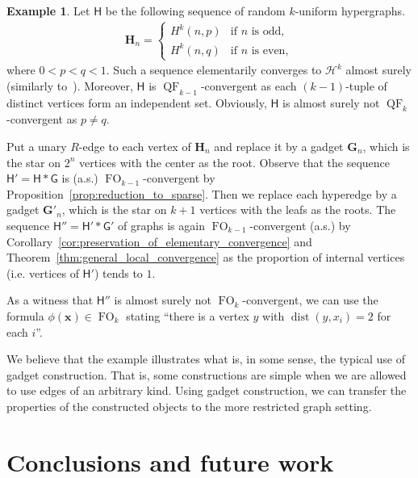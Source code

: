 \documentclass[11pt]{article}
\theoremstyle{plain}
\theoremstyle{definition}
\newtheorem{example}{Example}
\theoremstyle{remark}
\DeclareMathOperator\dist{dist}
\DeclareMathOperator\FO{FO}
\DeclareMathOperator\QF{QF}
\newcommand{\str}[1]{\mathbf{#1}}
\newcommand{\strseq}[1]{{\boldsymbol{\mathsf{#1}}}}
\newcommand{\tpl}[1]{{\bm{#1}}}
\begin{document}
\begin{example}\label{ex:bounded_convergence}
    Let $\strseq{H}$ be the following sequence of random $k$-uniform hypergraphs.
    \begin{align*}
        \str{H}_n =
        \begin{cases}
            H^k(n,p) & \text{if $n$ is odd}
            , \\
            H^k(n,q) & \text{if $n$ is even}
            ,
        \end{cases}
    \end{align*}
    where $0 < p < q < 1$.
    Such a sequence elementarily converges to $\mathcal{H}^k$ almost surely (similarly to~\cite[Lemma~2.33]{unified_approach}).
    Moreover, $\strseq{H}$ is $\QF_{k-1}$-convergent as each $(k-1)$-tuple of distinct vertices form an independent set.
    Obviously, $\strseq{H}$ is almost surely not $\QF_k$-convergent as $p \not= q$. 
    
    Put a unary $R$-edge to each vertex of $\str{H}_n$ and replace it by a gadget $\str{G}_n$, which is the star on $2^n$ vertices with the center as the root.
    Observe that the sequence $\strseq{H}' = \strseq{H} * \strseq{G}$ is (a.s.) $\FO_{k-1}$-convergent by Proposition~\ref{prop:reduction_to_sparse}.
    Then we replace each hyperedge by a gadget $\str{G}'_n$, which is the star on $k+1$ vertices with the leafs as the roots.
    The sequence $\strseq{H}'' = \strseq{H}' * \strseq{G}'$ of graphs is again $\FO_{k-1}$-convergent (a.s.) by Corollary~\ref{cor:preservation_of_elementary_convergence} and Theorem~\ref{thm:general_local_convergence} as the proportion of internal vertices (i.e. vertices of $\strseq{H}'$) tends to $1$.
    
    As a witness that $\strseq{H}''$ is almost surely not $\FO_k$-convergent, we can use the formula $\phi(\tpl{x}) \in \FO_k$ stating ``there is a vertex $y$ with $\dist(y, x_i) = 2$ for each $i$''.
\end{example}

We believe that the example illustrates what is, in some sense, the typical use of gadget construction.
That is, some constructions are simple when we are allowed to use edges of an arbitrary kind.
Using gadget construction, we can transfer the properties of the constructed objects to the more restricted graph setting. \section{Conclusions and future work}\label{sec:conclusions}
\end{document}
